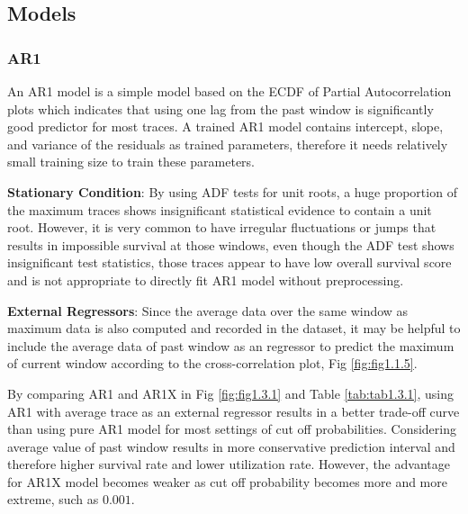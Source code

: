 \documentclass{article}
\begin{document}
\subsection{Models}

\subsubsection{AR1}

\begin{flushleft}
An AR1 model is a simple model based on the ECDF of Partial Autocorrelation plots which indicates that using one lag from the past window is significantly good predictor for most traces. A trained AR1 model contains intercept, slope, and variance of the residuals as trained parameters, therefore it needs relatively small training size to train these parameters. 
\end{flushleft}

\begin{flushleft}
\textbf{Stationary Condition}: By using ADF tests for unit roots, a huge proportion of the maximum traces shows insignificant statistical evidence to contain a unit root. However, it is very common to have irregular fluctuations or jumps that results in impossible survival at those windows, even though the ADF test shows insignificant test statistics, those traces appear to have low overall survival score and is not appropriate to directly fit AR1 model without preprocessing.
\end{flushleft}

\begin{flushleft}
\textbf{External Regressors}: Since the average data over the same window as maximum data is also computed and recorded in the dataset, it may be helpful to include the average data of past window as an regressor to predict the maximum of current window according to the cross-correlation plot, Fig \ref{fig:fig1.1.5}.

By comparing AR1 and AR1X in Fig \ref{fig:fig1.3.1} and Table \ref{tab:tab1.3.1}, using AR1 with average trace as an external regressor results in a better trade-off curve than using pure AR1 model for most settings of cut off probabilities. Considering average value of past window results in more conservative prediction interval and therefore higher survival rate and lower utilization rate. However, the advantage for AR1X model becomes weaker as cut off probability becomes more and more extreme, such as $0.001$.
\end{flushleft}
\end{document}
